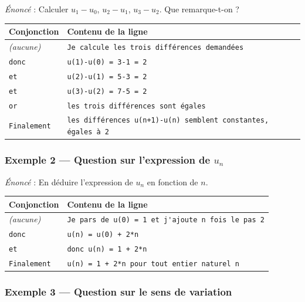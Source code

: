\documentclass[11pt,a4paper]{article}
\begin{document}
\emph{Énoncé} : \og Calculer \(u_1-u_0\), \(u_2-u_1\), \(u_3-u_2\). Que remarque-t-on ? \fg

\begin{center}
\renewcommand{\arraystretch}{1.25}
\begin{tabular}{@{}p{2.4cm}p{11.5cm}@{}}
\toprule
\textbf{Conjonction} & \textbf{Contenu de la ligne} \\
\midrule
\emph{(aucune)} & \verb|Je calcule les trois différences demandées| \\
\texttt{donc}   & \verb|u(1)-u(0) = 3-1 = 2| \\
\texttt{et}     & \verb|u(2)-u(1) = 5-3 = 2| \\
\texttt{et}     & \verb|u(3)-u(2) = 7-5 = 2| \\
\texttt{or}     & \verb|les trois différences sont égales| \\
\texttt{Finalement} & \verb|les différences u(n+1)-u(n) semblent constantes, égales à 2| \\
\bottomrule
\end{tabular}
\end{center}

\subsubsection*{Exemple 2 — Question sur l'expression de \(u_n\)}

\emph{Énoncé} : \og En déduire l'expression de \(u_n\) en fonction de \(n\). \fg

\begin{center}
\renewcommand{\arraystretch}{1.25}
\begin{tabular}{@{}p{2.4cm}p{11.5cm}@{}}
\toprule
\textbf{Conjonction} & \textbf{Contenu de la ligne} \\
\midrule
\emph{(aucune)} & \verb|Je pars de u(0) = 1 et j'ajoute n fois le pas 2| \\
\texttt{donc}   & \verb|u(n) = u(0) + 2*n| \\
\texttt{et}     & \verb|donc u(n) = 1 + 2*n| \\
\texttt{Finalement} & \verb|u(n) = 1 + 2*n pour tout entier naturel n| \\
\bottomrule
\end{tabular}
\end{center}

\subsubsection*{Exemple 3 — Question sur le sens de variation}
\end{document}
